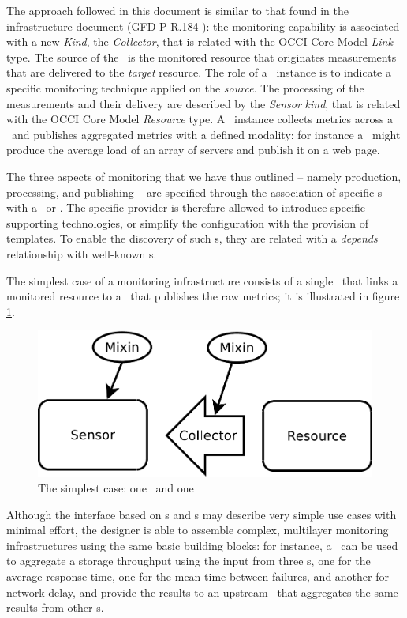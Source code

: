 \documentclass[12pt]{article}  %
\begin{document}
The approach followed in this document is similar to that found in the infrastructure document (GFD-P-R.184 \cite{occi:infr}): the monitoring capability is associated with a new {\em Kind}, the {\em Collector}, that is related with the OCCI Core Model {\em Link} type. The source of the \coll\ is the monitored resource that originates measurements that are delivered to the {\em target} resource. The role of a \coll\ instance is to indicate a specific monitoring technique applied on the {\em source}. The processing of the measurements and their delivery are described by the {\em Sensor} {\em kind}, that is related with the OCCI Core Model {\em Resource} type. A \sens\ instance collects metrics across a \coll\ and publishes aggregated metrics with a defined modality: for instance a \sens\ might produce the average load of an array of servers and publish it on a web page.

The three aspects of monitoring that we have thus outlined -- namely production, processing, and publishing -- are specified through the association of specific \mi s with a \sens\ or \coll. The specific provider is therefore allowed to introduce specific supporting technologies, or simplify the configuration with the provision of templates. To enable the discovery of such \mi s, they are related with a {\em depends} relationship with well-known \mi s.

The simplest case of a monitoring infrastructure consists of a single \coll\ that links a monitored resource to a \sens\ that publishes the raw metrics; it is illustrated in figure \ref{fig:onestage}.

\begin{figure}
\centering
\includegraphics[width=0.5 \linewidth]{onestage.pdf}
\caption{The simplest case: one \coll\ and one \sens\ \label{fig:onestage}}
\end{figure}

Although the interface based on \sens s and \coll s may describe very simple use cases with minimal effort, the designer is able to assemble complex, multilayer monitoring infrastructures using the same basic building blocks: for instance, a \sens\ can be used to aggregate a storage throughput using the input from three \coll s, one for the average response time, one for the mean time between failures, and another for network delay, and provide the results to an upstream \sens\ that aggregates the same results from other \sens s.
\end{document}
